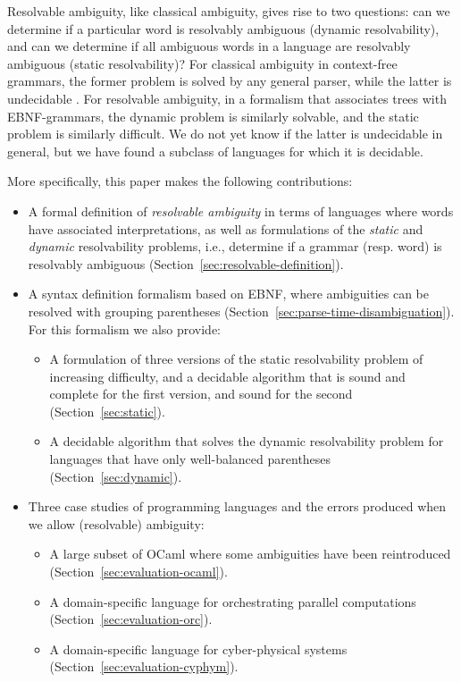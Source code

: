 \documentclass[acmsmall,review,anonymous]{acmart}\settopmatter{printfolios=true,printccs=false,printacmref=false}
\begin{document}
Resolvable ambiguity, like classical ambiguity, gives rise to two questions: can we determine if a particular word is resolvably ambiguous (dynamic resolvability), and can we determine if all ambiguous words in a language are resolvably ambiguous (static resolvability)? For classical ambiguity in context-free grammars, the former problem is solved by any general parser, while the latter is undecidable \cite{cantorAmbiguityProblemBackus1962}. For resolvable ambiguity, in a formalism that associates trees with EBNF-grammars, the dynamic problem is similarly solvable, and the static problem is similarly difficult. We do not yet know if the latter is undecidable in general, but we have found a subclass of languages for which it is decidable.

More specifically, this paper makes the following contributions:

\begin{itemize}
\item A formal definition of \emph{resolvable ambiguity} in terms of languages where words have associated interpretations, as well as formulations of the \emph{static} and \emph{dynamic} resolvability problems, i.e., determine if a grammar (resp. word) is resolvably ambiguous (Section~\ref{sec:resolvable-definition}).
\item A syntax definition formalism based on EBNF, where ambiguities can be resolved with grouping parentheses (Section~\ref{sec:parse-time-disambiguation}). For this formalism we also provide:
  \begin{itemize}
  \item A formulation of three versions of the static resolvability problem of increasing difficulty, and a decidable algorithm that is sound and complete for the first version, and sound for the second (Section~\ref{sec:static}).
  \item A decidable algorithm that solves the dynamic resolvability problem for languages that have only well-balanced parentheses (Section~\ref{sec:dynamic}).
  \end{itemize}
\item Three case studies of programming languages and the errors produced when we allow (resolvable) ambiguity:
  \begin{itemize}
  \item A large subset of OCaml where some ambiguities have been reintroduced (Section~\ref{sec:evaluation-ocaml}).
  \item A domain-specific language for orchestrating parallel computations (Section~\ref{sec:evaluation-orc}).
  \item A domain-specific language for cyber-physical systems (Section~\ref{sec:evaluation-cyphym}).
  \end{itemize}
\end{itemize}
\end{document}
